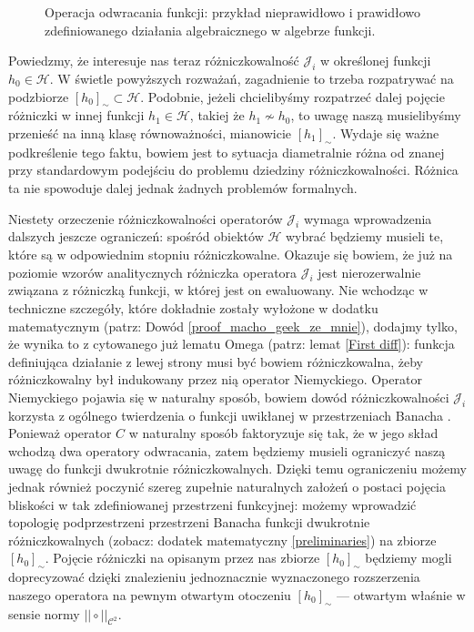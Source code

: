 \begin{figure}
\begin{center}
	\end{center}
	\caption[Operacja odwracania funkcji]{Operacja odwracania funkcji: przykład nieprawidłowo i prawidłowo zdefiniowanego działania algebraicznego w algebrze funkcji.
	\\ }
\end{figure}
 	
 	Powiedzmy, że interesuje nas teraz różniczkowalność $\mathcal{J}_i$ w określonej funkcji $h_0 \in \mathcal{H}$. W świetle powyższych rozważań, zagadnienie to trzeba rozpatrywać na podzbiorze $[h_0]_{\sim} \subset \mathcal{H}$. Podobnie, jeżeli chcielibyśmy rozpatrzeć dalej pojęcie różniczki w innej funkcji $h_1 \in \mathcal{H}$, takiej że $h_1 \not \sim h_0$, to uwagę naszą musielibyśmy przenieść na inną klasę równoważności, mianowicie $[h_1]_{\sim}$. Wydaje się ważne podkreślenie tego faktu, bowiem jest to sytuacja diametralnie różna od znanej przy standardowym podejściu do problemu dziedziny różniczkowalności. Różnica ta nie spowoduje dalej jednak żadnych problemów formalnych. 
 
 	Niestety orzeczenie różniczkowalności operatorów $\mathcal{J}_{i}$ wymaga wprowadzenia dalszych jeszcze ograniczeń: spośród obiektów $\mathcal{H}$ wybrać będziemy musieli te, które są w odpowiednim stopniu różniczkowalne. Okazuje się bowiem, że już na poziomie wzorów analitycznych różniczka operatora $\mathcal{J}_{i}$ jest nierozerwalnie związana z różniczką funkcji, w której jest on ewaluowany. Nie wchodząc w techniczne szczegóły, które dokładnie zostały wyłożone w dodatku matematycznym (patrz: Dowód \ref{proof_macho_geek_ze_mnie}), dodajmy tylko, że wynika to z cytowanego już lematu Omega (patrz: lemat \ref{First diff}): funkcja definiująca działanie z lewej strony musi być bowiem różniczkowalna, żeby różniczkowalny był indukowany przez nią operator Niemyckiego. Operator Niemyckiego pojawia się w naturalny sposób, bowiem dowód różniczkowalności $\mathcal{J}_i$ korzysta z ogólnego twierdzenia o funkcji uwikłanej w przestrzeniach Banacha \citep[ogólne twierdzenie o funkcji uwikłanej --- patrz:][]{Maurin}. Ponieważ operator $C$ w naturalny sposób faktoryzuje się tak, że w jego skład wchodzą dwa operatory odwracania, zatem będziemy musieli ograniczyć naszą uwagę do funkcji dwukrotnie różniczkowalnych. Dzięki temu ograniczeniu możemy jednak również poczynić szereg zupełnie naturalnych założeń o postaci pojęcia bliskości w tak zdefiniowanej przestrzeni funkcyjnej: możemy wprowadzić topologię podprzestrzeni przestrzeni Banacha funkcji dwukrotnie różniczkowalnych (zobacz: dodatek matematyczny \ref{preliminaries}) na zbiorze $[h_0]_{\sim}$. Pojęcie różniczki na opisanym przez nas zbiorze $[h_0]_{\sim}$ będziemy mogli doprecyzować dzięki znalezieniu jednoznacznie wyznaczonego rozszerzenia naszego operatora na pewnym otwartym otoczeniu $[h_0]_{\sim}$ --- otwartym właśnie w sensie normy $||\circ||_{\mathcal{C}^{2}}$. 
 	
